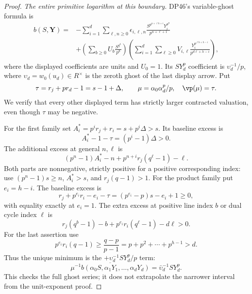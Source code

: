 \begin{proof}
\emph{The entire primitive logarithm at this boundary.}
DP46's variable-ghost formula is
\begin{align*}
 b(S,\mathbf Y)
 ={}&-\sum_{i=1}^d\sum_{\ell,n\ge0}
 \epsilon_{i,\ell,n}
 \frac{S^{p^{n+\ell h+i}}Y_i^{p^n}}{p^{n+\ell+1}}\\
 &+\left(\sum_{b\ge0}U_b\frac{S^{q^b}}{p^b}\right)
   \left(\sum_{i=1}^d\sum_{\ell\ge0}
       V_{i,\ell}\frac{Y_i^{p^{\ell h+h-i}}}{p^{d\ell+h-i}}\right),
\end{align*}
where the displayed coefficients are units and $U_0=1$.
Its $SY_d^p$ coefficient is $\upsilon_d^{-1}/p$, where
$\upsilon_d=w_0(u_d)\in R^\times$ is the zeroth ghost of the last display arrow.
Put
\[
 \tau=r_j+pr_d-1=s-1+\Delta,\qquad
 \mu=\alpha_0\alpha_d^p/p,
 \quad\vp(\mu)=\tau.
\]
We verify that every other displayed term has strictly larger contracted valuation, even though $\tau$ may be negative.

For the first family set $A_i^*=p^ir_j+r_i=s+p^i\Delta>s$.
Its baseline excess is
\[
 A_i^*-1-\tau=(p^i-1)\Delta>0.
\]
The additional excess at general $n,\ell$ is
\[
 (p^n-1)A_i^*-n+p^{n+i}r_j(q^\ell-1)-\ell.
\]
Both parts are nonnegative, strictly positive for a positive corresponding index: use $(p^n-1)s\ge n$, $A_i^*>s$, and $r_j(q-1)>1$.
For the product family put $e_i=h-i$. The baseline excess is
\[
 r_j+p^{e_i}r_i-e_i-\tau
       =(p^{e_i}-p)s-e_i+1\ge0,
\]
with equality exactly at $e_i=1$.
The extra excess at positive line index $b$ or dual cycle index $\ell$ is
\[
 r_j(q^b-1)-b+p^{e_i}r_i(q^\ell-1)-d\ell>0.
\]
For the last assertion use
\[
 p^{e_i}r_i(q-1)\ge\frac{q-p}{p-1}
       =p+p^2+\cdots+p^{h-1}>d.
\]
Thus the unique minimum is the $+\upsilon_d^{-1}SY_d^p/p$ term:
\begin{equation}\label{eq:nonunitloginitial}
 \overline{\mu^{-1}b(\alpha_0S,\alpha_1Y_1,\ldots,\alpha_dY_d)}
       =\bar\upsilon_d^{-1}SY_d^p.
\end{equation}
This checks the full ghost series; it does not extrapolate the narrower interval from the unit-exponent proof.


\end{proof}
